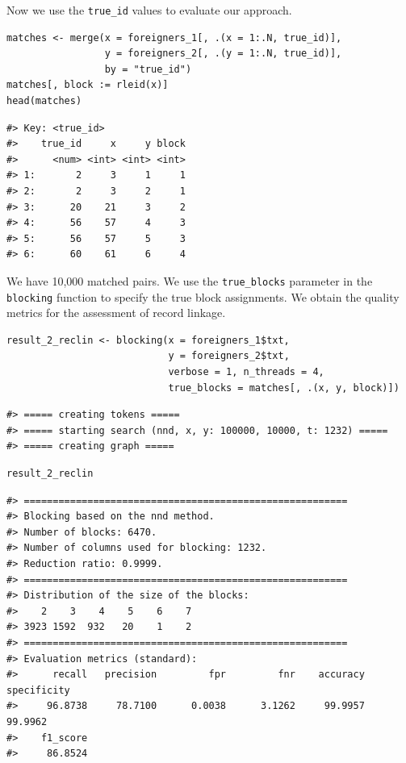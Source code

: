 Now we use the \texttt{true\_id} values to evaluate our approach.

\begin{verbatim}
matches <- merge(x = foreigners_1[, .(x = 1:.N, true_id)],
                 y = foreigners_2[, .(y = 1:.N, true_id)],
                 by = "true_id")
matches[, block := rleid(x)]
head(matches)
\end{verbatim}

\begin{verbatim}
#> Key: <true_id>
#>    true_id     x     y block
#>      <num> <int> <int> <int>
#> 1:       2     3     1     1
#> 2:       2     3     2     1
#> 3:      20    21     3     2
#> 4:      56    57     4     3
#> 5:      56    57     5     3
#> 6:      60    61     6     4
\end{verbatim}

We have 10,000 matched pairs. We use the \texttt{true\_blocks} parameter in the \texttt{blocking} function to specify the true block assignments. We obtain the quality metrics for the assessment of record linkage.

\begin{verbatim}
result_2_reclin <- blocking(x = foreigners_1$txt, 
                            y = foreigners_2$txt, 
                            verbose = 1, n_threads = 4, 
                            true_blocks = matches[, .(x, y, block)])
\end{verbatim}

\begin{verbatim}
#> ===== creating tokens =====
#> ===== starting search (nnd, x, y: 100000, 10000, t: 1232) =====
#> ===== creating graph =====
\end{verbatim}

\begin{verbatim}
result_2_reclin
\end{verbatim}

\begin{verbatim}
#> ========================================================
#> Blocking based on the nnd method.
#> Number of blocks: 6470.
#> Number of columns used for blocking: 1232.
#> Reduction ratio: 0.9999.
#> ========================================================
#> Distribution of the size of the blocks:
#>    2    3    4    5    6    7 
#> 3923 1592  932   20    1    2 
#> ========================================================
#> Evaluation metrics (standard):
#>      recall   precision         fpr         fnr    accuracy specificity 
#>     96.8738     78.7100      0.0038      3.1262     99.9957     99.9962 
#>    f1_score 
#>     86.8524
\end{verbatim}

